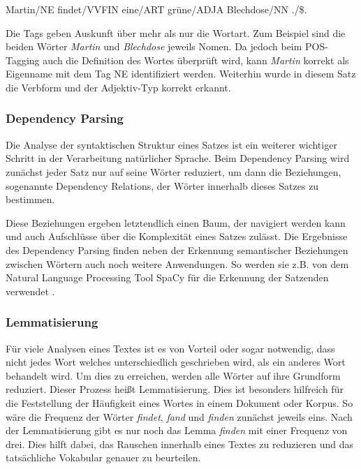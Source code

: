 Martin/NE findet/VVFIN eine/ART grüne/ADJA Blechdose/NN ./\$.

Die Tags geben Auskunft über mehr als nur die Wortart. Zum Beispiel sind die beiden Wörter \textit{Martin} und \textit{Blechdose} jeweils Nomen. Da jedoch beim POS-Tagging auch die Definition des Wortes überprüft wird, kann \textit{Martin} korrekt als Eigenname mit dem Tag NE identifiziert werden. Weiterhin wurde in diesem Satz die Verbform und der Adjektiv-Typ korrekt erkannt.

\subsubsection*{Dependency Parsing}
Die Analyse der syntaktischen Struktur eines Satzes ist ein weiterer wichtiger Schritt in der Verarbeitung natürlicher Sprache. Beim Dependency Parsing wird zunächst jeder Satz nur auf seine Wörter reduziert, um dann die Beziehungen, sogenannte Dependency Relations, der Wörter innerhalb dieses Satzes zu bestimmen.


Diese Beziehungen ergeben letztendlich einen Baum, der navigiert werden kann und auch Aufschlüsse über die Komplexität eines Satzes zulässt. Die Ergebnisse des Dependency Parsing finden neben der Erkennung semantischer Beziehungen zwischen Wörtern auch noch weitere Anwendungen. So werden sie z.B. von dem Natural Language Processing Tool SpaCy für die Erkennung der Satzenden  verwendet \cite{spacyDependencyParsing}.

\subsubsection*{Lemmatisierung}
Für viele Analysen eines Textes ist es von Vorteil oder sogar notwendig, dass nicht jedes Wort welches unterschiedlich geschrieben wird, als ein anderes Wort behandelt wird. Um dies zu erreichen, werden alle Wörter auf ihre Grundform reduziert. Dieser Prozess heißt Lemmatisierung. Dies ist besonders hilfreich für die Feststellung der Häufigkeit eines Wortes in einem Dokument oder Korpus. So wäre die Frequenz der Wörter \textit{findet}, \textit{fand} und \textit{finden} zunächst jeweils eins. Nach der Lemmatisierung gibt es nur noch das Lemma \textit{finden} mit einer Frequenz von drei. Dies hilft dabei, das Rauschen innerhalb eines Textes zu reduzieren und das tatsächliche Vokabular genauer zu beurteilen.


